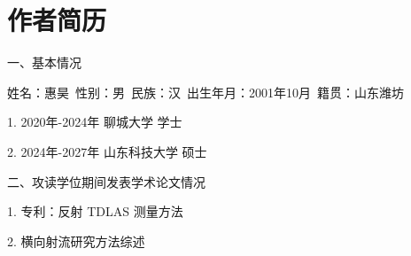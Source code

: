 


\chapter*{作者简历}

一、基本情况

姓名：惠昊\ 性别：男\ 民族：汉\ 出生年月：2001年10月\ 籍贯：山东潍坊

1. 2020年-2024年 聊城大学 学士

2. 2024年-2027年 山东科技大学 硕士

二、攻读学位期间发表学术论文情况

1. 专利：反射 TDLAS 测量方法

2. 横向射流研究方法综述


